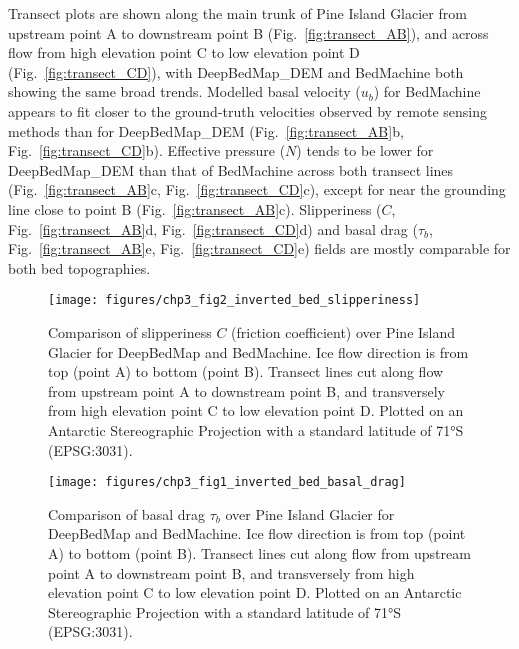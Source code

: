 Transect plots are shown along the main trunk of Pine Island Glacier from upstream point A to downstream point B (Fig.~\ref{fig:transect_AB}), and across flow from high elevation point C to low elevation point D (Fig.~\ref{fig:transect_CD}), with DeepBedMap\_DEM \citep{LeongDeepBedMap2020} and BedMachine \citep{MorlighemMEaSUREsBedMachineAntarctica2020} both showing the same broad trends.
Modelled basal velocity ($u_b$) for BedMachine appears to fit closer to the ground-truth velocities observed by remote sensing methods \citep{MouginotMEaSUREsPhaseMap2019} than for DeepBedMap\_DEM (Fig.~\ref{fig:transect_AB}b, Fig.~\ref{fig:transect_CD}b).
Effective pressure ($N$) tends to be lower for DeepBedMap\_DEM than that of BedMachine across both transect lines (Fig.~\ref{fig:transect_AB}c, Fig.~\ref{fig:transect_CD}c), except for near the grounding line close to point B (Fig.~\ref{fig:transect_AB}c).
Slipperiness ($C$, Fig.~\ref{fig:transect_AB}d, Fig.~\ref{fig:transect_CD}d) and basal drag ($\tau_b$, Fig.~\ref{fig:transect_AB}e, Fig.~\ref{fig:transect_CD}e) fields are mostly comparable for both bed topographies.

\begin{landscape}
\begin{figure}[htbp]
  \centering
  \texttt{[image: figures/chp3\_fig2\_inverted\_bed\_slipperiness]}
  \caption[Comparison of slipperiness over Pine Island Glacier for DeepBedMap and BedMachine]{
    Comparison of slipperiness $C$ (friction coefficient) over Pine Island Glacier for DeepBedMap and BedMachine.
    Ice flow direction is from top (point A) to bottom (point B).
    Transect lines cut along flow from upstream point A to downstream point B, and transversely from high elevation point C to low elevation point D.
    Plotted on an Antarctic Stereographic Projection with a standard latitude of 71°S (EPSG:3031).
  }
  \label{fig:slipperiness}
\end{figure}
\end{landscape}

\begin{landscape}
\begin{figure}[htbp]
  \texttt{[image: figures/chp3\_fig1\_inverted\_bed\_basal\_drag]}
  \caption[Comparison of basal drag over Pine Island Glacier for DeepBedMap and BedMachine]{
    Comparison of basal drag $\tau_b$ over Pine Island Glacier for DeepBedMap and BedMachine.
    Ice flow direction is from top (point A) to bottom (point B).
    Transect lines cut along flow from upstream point A to downstream point B, and transversely from high elevation point C to low elevation point D.
    Plotted on an Antarctic Stereographic Projection with a standard latitude of 71°S (EPSG:3031).
  }
  \label{fig:basal_drag}
\end{figure}
\end{landscape}

